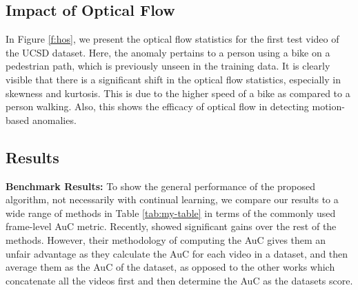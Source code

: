 \subsection{Impact of Optical Flow}
In Figure \ref{f:hos}, we present the optical flow statistics for the first test video of the UCSD dataset. Here, the anomaly pertains to a person using a bike on a pedestrian path, which is previously unseen in the training data. It is clearly visible that there is a significant shift in the optical flow statistics, especially in skewness and kurtosis. This is due to the higher speed of a bike as compared to a person walking. Also, this shows the efficacy of optical flow in detecting motion-based anomalies.     

\subsection{Results}
\textbf{Benchmark Results:}
To show the general performance of the proposed algorithm, not necessarily with continual learning, we compare our results to a wide range of methods in Table \ref{tab:my-table} in terms of the commonly used frame-level AuC metric. Recently, \cite{ionescu2019object} showed significant gains over the rest of the methods. However, their methodology of computing the AuC gives them an unfair advantage as they calculate the AuC for each video in a dataset, and then average them as the AuC of the dataset, as opposed to the other works which concatenate all the videos first and then determine the AuC as the datasets score.

\begin{table}[]
\centering
{}
\vspace{2mm}
\caption{AuC result comparison on three datasets.}
\label{tab:my-table}
\end{table}


